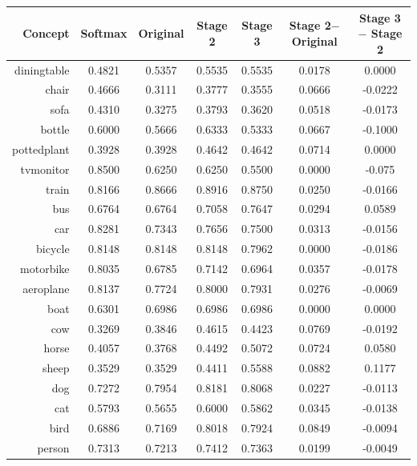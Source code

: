 \documentclass[11pt,a4paper]{article}
\begin{document}
\begin{table}[htbp]
\centering
\begin{tabular}{r|c|c|c|c|c|c}
Concept & Softmax & Original & Stage 2 & Stage 3 & \makecell{Stage 2$-$\\Original} & \makecell{Stage 3$-$\\Stage 2}\\\hline
diningtable   & 0.4821 & 0.5357 & 0.5535 & 0.5535 & 0.0178 & 0.0000\\
chair         & 0.4666 & 0.3111 & 0.3777 & 0.3555 & 0.0666 & -0.0222\\
sofa          & 0.4310 & 0.3275 & 0.3793 & 0.3620 & 0.0518 & -0.0173\\
bottle        & 0.6000 & 0.5666 & 0.6333 & 0.5333 & 0.0667 & -0.1000\\
pottedplant   & 0.3928 & 0.3928 & 0.4642 & 0.4642 & 0.0714 & 0.0000\\
tvmonitor     & 0.8500 & 0.6250 & 0.6250 & 0.5500 & 0.0000 & -0.075\\
train         & 0.8166 & 0.8666 & 0.8916 & 0.8750 & 0.0250 & -0.0166\\
bus           & 0.6764 & 0.6764 & 0.7058 & 0.7647 & 0.0294 & 0.0589\\
car           & 0.8281 & 0.7343 & 0.7656 & 0.7500 & 0.0313 & -0.0156\\
bicycle       & 0.8148 & 0.8148 & 0.8148 & 0.7962 & 0.0000 & -0.0186\\
motorbike     & 0.8035 & 0.6785 & 0.7142 & 0.6964 & 0.0357 & -0.0178\\
aeroplane     & 0.8137 & 0.7724 & 0.8000 & 0.7931 & 0.0276 & -0.0069\\
boat          & 0.6301 & 0.6986 & 0.6986 & 0.6986 & 0.0000 & 0.0000\\
cow           & 0.3269 & 0.3846 & 0.4615 & 0.4423 & 0.0769 & -0.0192\\
horse         & 0.4057 & 0.3768 & 0.4492 & 0.5072 & 0.0724 & 0.0580\\
sheep         & 0.3529 & 0.3529 & 0.4411 & 0.5588 & 0.0882 & 0.1177\\
dog           & 0.7272 & 0.7954 & 0.8181 & 0.8068 & 0.0227 & -0.0113\\
cat           & 0.5793 & 0.5655 & 0.6000 & 0.5862 & 0.0345 & -0.0138\\
bird          & 0.6886 & 0.7169 & 0.8018 & 0.7924 & 0.0849 & -0.0094\\
person        & 0.7313 & 0.7213 & 0.7412 & 0.7363 & 0.0199 & -0.0049\\\hline

\end{tabular}
\end{table}
\end{document}
